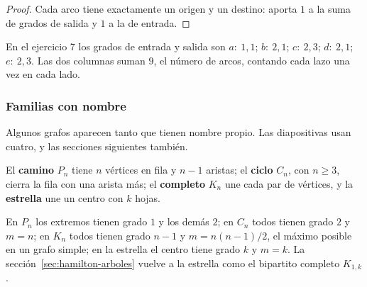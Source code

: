 \documentclass[11pt,letterpaper]{article}
\begin{document}
\begin{proof}
  Cada arco tiene exactamente un origen y un destino: aporta $1$ a la
  suma de grados de salida y $1$ a la de entrada.
\end{proof}

En el ejercicio 7 los grados de entrada y salida son $a{:}\ 1, 1$;
$b{:}\ 2, 1$; $c{:}\ 2, 3$; $d{:}\ 2, 1$; $e{:}\ 2, 3$. Las dos columnas
suman $9$, el número de arcos, contando cada lazo una vez en cada lado.

\subsubsection*{Familias con nombre}

Algunos grafos aparecen tanto que tienen nombre propio. Las
diapositivas usan cuatro, y las secciones siguientes también.

\begin{ejemplo}
  \label{ej:familias-teoria}
  El \textbf{camino} $P_n$ tiene $n$ vértices en fila y $n - 1$
  aristas; el \textbf{ciclo} $C_n$, con $n \geq 3$, cierra la fila con
  una arista más; el \textbf{completo} $K_n$ une cada par de vértices,
  y la \textbf{estrella} une un centro con $k$ hojas.
  \begin{center}
  \end{center}
  En $P_n$ los extremos tienen grado $1$ y los demás $2$; en $C_n$
  todos tienen grado $2$ y $m = n$; en $K_n$ todos tienen grado $n - 1$
  y $m = n(n-1)/2$, el máximo posible en un grafo simple; en la
  estrella el centro tiene grado $k$ y $m = k$. La
  sección~\ref{sec:hamilton-arboles} vuelve a la estrella como el
  bipartito completo $K_{1,k}$.
\end{ejemplo}
\end{document}
